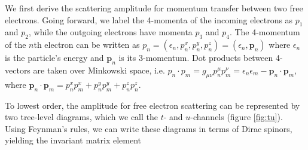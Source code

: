 \documentclass{article}
\begin{document}
We first derive the scattering amplitude for momentum transfer between two free electrons.
Going forward, we label the 4-momenta of the incoming electrons as $p_1$ and $p_2$, while the outgoing electrons have momenta $p_3$ and $p_4$.
The 4-momentum of the $n$th electron can be written as
$p_n = (\epsilon_n, p_n^x, p_n^y, p_n^z) = (\epsilon_n, \mathbf{p}_n)$
%
where $\epsilon_n$ is the particle's energy and $\mathbf{p}_n$ is its 3-momentum.
Dot products between 4-vectors are taken over Minkowski space, i.e. $p_n\cdot p_m = g_{\mu\nu}p_n^\mu p_m^\nu = \epsilon_n\epsilon_m - \mathbf{p}_n\cdot\mathbf{p}_m$, where $\mathbf{p}_n\cdot\mathbf{p}_m = p_n^xp_m^x + p_n^yp_m^y + p_n^zp_n^z$.   

To lowest order, the amplitude for free electron scattering can be represented by two tree-level diagrams, which we call the $t$- and $u$-channels (figure \ref{fig:tu}).
Using Feynman's rules, we can write these diagrams in terms of Dirac spinors, yielding the invariant matrix element
\end{document}
